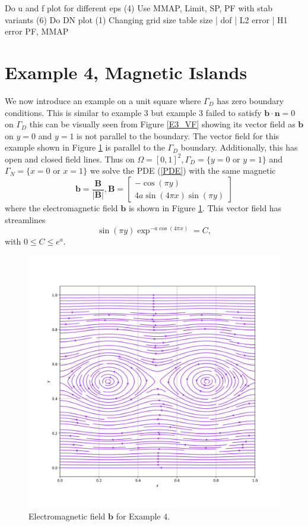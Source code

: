 \documentclass[12pt]{ociamthesis}
\begin{document}
Do u and f plot for different eps (4)
Use MMAP, Limit, SP, PF
with stab variants (6)
Do DN plot (1)
Changing grid size table 
size | dof | L2 error | H1 error PF, MMAP

\section{Example 4, Magnetic Islands}

We now introduce an example on a unit square where $\Gamma_D$ has zero boundary conditions. This is similar to example $3$ but example $3$ failed to satisfy $\mathbf{b}\cdot\mathbf{n} = 0$ on $\Gamma_D$ this can be visually seen from Figure \ref{E3_VF} showing its vector field as $\mathbf{b}$ on $y=0$ and $y=1$ is not parallel to the boundary. The vector field for this example shown in Figure \ref{E4_VF} is parallel to the $\Gamma_D$ boundary. Additionally, this has open and closed field lines.
Thus on $\Omega = [0,1]^2, \Gamma_D = \{y=0 \text{ or } y=1\}$ and $\Gamma_N = \{x=0 \text{ or } x=1\}$ we solve the PDE (\ref{PDE}) with the same magnetic
\begin{equation}
\mathbf{b} = \frac{\mathbf{B}}{|\mathbf{B}|}, 
\mathbf{B} = \left[ \begin{matrix}
-\cos(\pi y)\\
4a \sin(4 \pi x) \sin(\pi y)
\end{matrix} \right]
\end{equation}
where the electromagnetic field $\mathbf{b}$ is shown in Figure \ref{E4_VF}. This vector field has streamlines 
\begin{equation}
\sin(\pi y)\exp^{-a\cos(4\pi x)} = C,
\end{equation}
with $0\leq C \leq e^a$.
\begin{figure}[H]
 \includegraphics[width=\textwidth]{Pics/VectorField/E4b.png}
  \caption{Electromagnetic field $\mathbf{b}$ for Example $4$.}
 \label{E4_VF}
\end{figure}
\end{document}
